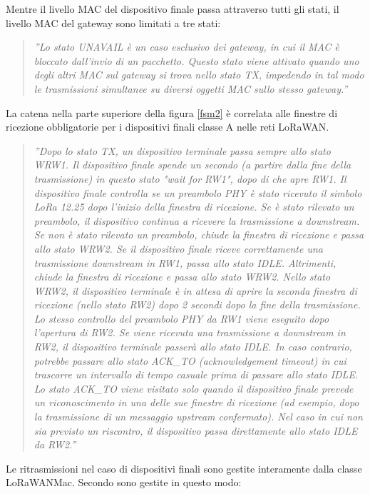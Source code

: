 \documentclass[a4paper]{report} %
\begin{document}
Mentre il livello MAC del dispositivo finale passa attraverso tutti gli stati, il livello MAC del gateway sono limitati a tre stati:
\begin{quote}
	\textit{''Lo stato UNAVAIL è un caso esclusivo dei gateway, in cui il MAC è bloccato dall'invio di un pacchetto. Questo stato viene attivato quando uno degli altri MAC sul gateway si trova nello stato TX, impedendo in tal modo le trasmissioni simultanee su diversi oggetti MAC sullo stesso gateway.''} 
\end{quote}	
La catena nella parte superiore della figura \ref{fsm2} è correlata alle finestre di ricezione obbligatorie per i dispositivi finali classe A nelle reti LoRaWAN. 
\begin{quote}
	\textit{''Dopo lo stato TX, un dispositivo terminale passa sempre allo stato WRW1. Il dispositivo finale spende un secondo (a partire dalla fine della trasmissione) in questo stato "wait for RW1", dopo di che apre RW1. Il dispositivo finale controlla se un preambolo PHY è stato ricevuto il simbolo LoRa 12.25 dopo l'inizio della finestra di ricezione. Se è stato rilevato un preambolo, il dispositivo continua a ricevere la trasmissione a downstream.	Se non è stato rilevato un preambolo, chiude la finestra di ricezione e passa allo stato WRW2. Se il dispositivo finale riceve correttamente una trasmissione downstream in RW1, passa allo stato IDLE. Altrimenti, chiude la finestra di ricezione e passa allo stato WRW2. Nello stato WRW2, il dispositivo terminale è in attesa di aprire la seconda finestra di ricezione (nello stato RW2) dopo 2 secondi dopo la fine della trasmissione. Lo stesso controllo del preambolo PHY da RW1 viene eseguito dopo l'apertura di RW2. Se viene ricevuta una trasmissione a downstream in RW2, il dispositivo terminale passerà allo stato IDLE. In caso contrario, potrebbe passare allo stato ACK\_TO (acknowledgement timeout) in cui trascorre un intervallo di tempo casuale prima di passare allo stato IDLE. Lo stato ACK\_TO viene visitato solo quando il dispositivo finale prevede un riconoscimento in una delle sue finestre di ricezione (ad esempio, dopo la trasmissione di un messaggio upstream confermato). Nel caso in cui non sia previsto un riscontro, il dispositivo passa direttamente allo stato IDLE da RW2.''}
\end{quote}	
Le ritrasmissioni nel caso di dispositivi finali sono gestite interamente dalla classe LoRaWANMac. Secondo \cite{art:rif.49} sono gestite in questo modo:
\end{document}
